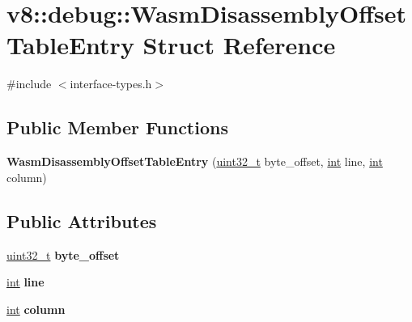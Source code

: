 \hypertarget{structv8_1_1debug_1_1WasmDisassemblyOffsetTableEntry}{}\section{v8\+:\+:debug\+:\+:Wasm\+Disassembly\+Offset\+Table\+Entry Struct Reference}
\label{structv8_1_1debug_1_1WasmDisassemblyOffsetTableEntry}


{\ttfamily \#include $<$interface-\/types.\+h$>$}

\subsection*{Public Member Functions}
\begin{DoxyCompactItemize}
\item 
\mbox{\label{structv8_1_1debug_1_1WasmDisassemblyOffsetTableEntry_aa67fb908b829b5937aa45cb0a72a299b}} 
{\bfseries Wasm\+Disassembly\+Offset\+Table\+Entry} (\mbox{\hyperlink{classuint32__t}{uint32\+\_\+t}} byte\+\_\+offset, \mbox{\hyperlink{classint}{int}} line, \mbox{\hyperlink{classint}{int}} column)
\end{DoxyCompactItemize}
\subsection*{Public Attributes}
\begin{DoxyCompactItemize}
\item 
\mbox{\label{structv8_1_1debug_1_1WasmDisassemblyOffsetTableEntry_a9d863e0b4bc9da9f2217984d18db81d8}} 
\mbox{\hyperlink{classuint32__t}{uint32\+\_\+t}} {\bfseries byte\+\_\+offset}
\item 
\mbox{\label{structv8_1_1debug_1_1WasmDisassemblyOffsetTableEntry_ac1371fff41b6a02edebca8a5e51f89b0}} 
\mbox{\hyperlink{classint}{int}} {\bfseries line}
\item 
\mbox{\label{structv8_1_1debug_1_1WasmDisassemblyOffsetTableEntry_a7e765d3a9dcfe96517313c0efd248a8b}} 
\mbox{\hyperlink{classint}{int}} {\bfseries column}
\end{DoxyCompactItemize}


